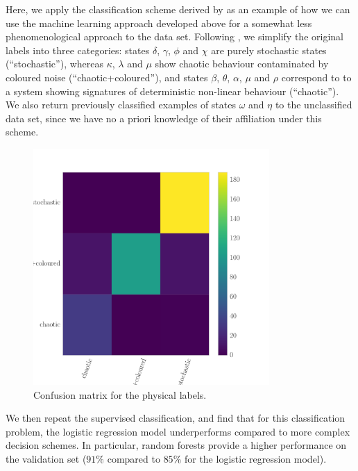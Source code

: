 \documentclass[fleqn,usenatbib]{mnras}
\begin{document}
Here, we apply the classification scheme derived by \citet{harikrishnan2011} as an example of how we can use the machine learning approach developed above 
for a somewhat less phenomenological approach to the data set. 
Following \citet{harikrishnan2011}, we simplify the original labels into three categories: states $\delta$, $\gamma$, $\phi$ and $\chi$ are purely stochastic states
(``stochastic''), whereas $\kappa$, $\lambda$ and $\mu$ show chaotic behaviour contaminated by coloured noise (``chaotic+coloured''), and states $\beta$, $\theta$, $\alpha$, $\mu$ and $\rho$ correspond to to a system showing signatures of deterministic non-linear behaviour (``chaotic'').
We also return previously classified examples of states $\omega$ and $\eta$ to the unclassified data set, since we have no a priori knowledge of their affiliation under this scheme.
\begin{figure}
\begin{center}
\includegraphics[width=9cm]{grs1915_supervised_phys_cm.pdf}
\caption{Confusion matrix for the physical labels.} 
\label{fig:confusionmatrix_physical}
\end{center}
\end{figure}
We then repeat the supervised classification, and find that for this classification problem, the logistic regression model underperforms compared to more complex decision schemes. In particular, random forests provide a higher performance on the validation set ($91\%$ compared to $85\%$ for the logistic regression model). 
\end{document}
